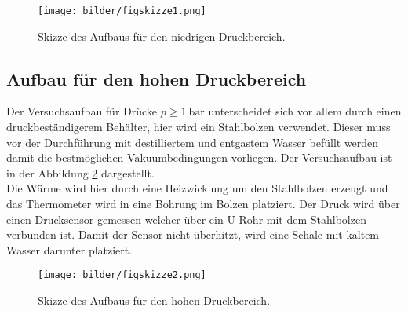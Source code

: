 \begin{figure}
    \centering
    \texttt{[image: bilder/figskizze1.png]}
    \caption{Skizze des Aufbaus für den niedrigen Druckbereich. \cite{skript}} 
    \label{fig:figskizze1}
\end{figure}

\subsection{Aufbau für den hohen Druckbereich} %
Der Versuchsaufbau für Drücke $p \geq \SI{1}{\bar}$ unterscheidet sich vor allem durch einen druckbeständigerem Behälter, hier wird ein Stahlbolzen verwendet. Dieser muss vor der Durchführung mit destilliertem und entgastem Wasser befüllt werden
damit die bestmöglichen Vakuumbedingungen vorliegen. Der Versuchsaufbau ist in der Abbildung \ref{fig:figskizze2} dargestellt.
\newline
\\
Die Wärme wird hier durch eine Heizwicklung um den Stahlbolzen erzeugt und das Thermometer wird in eine Bohrung im
Bolzen platziert. Der Druck wird über einen Drucksensor gemessen welcher über ein U-Rohr mit dem Stahlbolzen verbunden ist. Damit der Sensor nicht überhitzt, wird eine Schale mit kaltem Wasser darunter platziert.

\begin{figure}
    \centering
    \texttt{[image: bilder/figskizze2.png]}
    \caption{Skizze des Aufbaus für den hohen Druckbereich. \cite{skript}} 
    \label{fig:figskizze2}
\end{figure}


